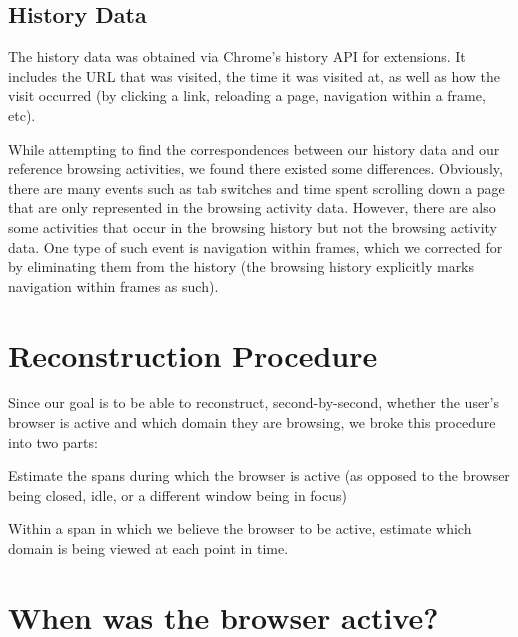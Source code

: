 \documentclass{sigchi}
\begin{document}
\subsection{History Data}

The history data was obtained via Chrome's history API for extensions. It includes the URL that was visited, the time it was visited at, as well as how the visit occurred (by clicking a link, reloading a page, navigation within a frame, etc).

While attempting to find the correspondences between our history data and our reference browsing activities, we found there existed some differences. Obviously, there are many events such as tab switches and time spent scrolling down a page that are only represented in the browsing activity data. However, there are also some activities that occur in the browsing history but not the browsing activity data. One type of such event is navigation within frames, which we corrected for by eliminating them from the history (the browsing history explicitly marks navigation within frames as such). %

\section{Reconstruction Procedure}

Since our goal is to be able to reconstruct, second-by-second, whether the user's browser is active and which domain they are browsing, we broke this procedure into two parts:

\begin{compactitem}
	\item Estimate the spans during which the browser is active (as opposed to the browser being closed, idle, or a different window being in focus)
	\item Within a span in which we believe the browser to be active, estimate which domain is being viewed at each point in time.
\end{compactitem}

\section{When was the browser active?}
\end{document}
